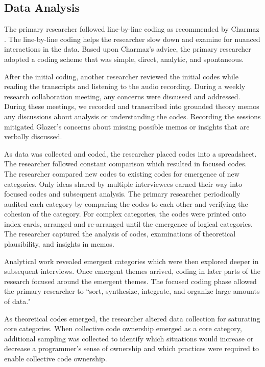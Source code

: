 \subsection{Data Analysis}
The primary researcher followed line-by-line coding as recommended by Charmaz \cite{Charmaz}. The line-by-line coding helps the researcher slow down and examine for nuanced interactions in the data. Based upon Charmaz's advice, the primary researcher adopted a coding scheme that was simple, direct, analytic, and spontaneous.  

After the initial coding, another researcher reviewed the initial codes while reading the transcripts and listening to the audio recording. During a weekly research collaboration meeting, any concerns were discussed and addressed. During these meetings, we recorded and transcribed into grounded theory memos any discussions about analysis or understanding the codes. Recording the sessions mitigated Glazer's concerns about missing possible memos or insights that are verbally discussed. \cite{GlaserTheoreticalSensitivity}

As data was collected and coded, the researcher placed codes into a spreadsheet. The researcher followed constant comparison which resulted in focused codes.  The researcher compared new codes to existing codes for emergence of new categories. Only ideas shared by multiple interviewees earned their way into focused codes and subsequent analysis. The primary researcher periodically audited each category by comparing the codes to each other and verifying the cohesion of the category. For complex categories, the codes were printed onto index cards, arranged and re-arranged until the emergence of logical categories.  The researcher captured the analysis of codes, examinations of theoretical plausibility, and insights in memos. 

Analytical work revealed emergent categories which were then explored deeper in subsequent interviews.  Once emergent themes arrived, coding in later parts of the research focused around the emergent themes. The focused coding phase allowed the primary researcher to ``sort, synthesize, integrate, and organize large amounts of data."

As theoretical codes emerged, the researcher altered data collection for saturating core categories. When collective code ownership emerged as a core category, additional sampling was collected to identify which situations would increase or decrease a programmer's sense of ownership and which practices were required to enable collective code ownership.

